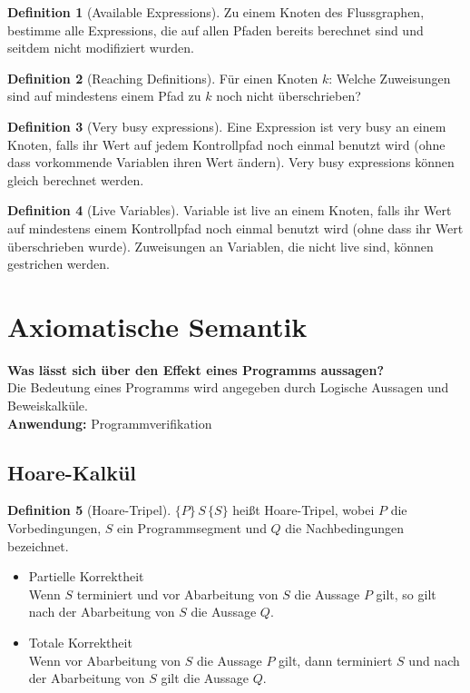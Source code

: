 \documentclass{scrreprt}
\theoremstyle{definition}
\newtheorem{Definition}{Definition}[section]
\theoremstyle{example}
\theoremstyle{algorithm}
\begin{document}
\begin{Definition}[Available Expressions]
Zu einem Knoten des Flussgraphen, bestimme alle Expressions, die auf allen Pfaden bereits berechnet sind und seitdem nicht modifiziert wurden.
\end{Definition}

\begin{Definition}[Reaching Definitions]
Für einen Knoten $k$: Welche Zuweisungen sind auf mindestens einem Pfad zu $k$ noch nicht überschrieben?
\end{Definition}

\begin{Definition}[Very busy expressions]
Eine Expression ist very busy an einem Knoten, falls ihr Wert auf jedem Kontrollpfad noch einmal benutzt wird (ohne dass vorkommende Variablen ihren Wert ändern). Very busy expressions können gleich berechnet werden.
\end{Definition}

\begin{Definition}[Live Variables]
Variable ist live an einem Knoten, falls ihr Wert auf mindestens einem Kontrollpfad noch einmal benutzt wird (ohne dass ihr Wert überschrieben wurde). Zuweisungen an Variablen, die nicht live sind, können gestrichen werden.
\end{Definition}

\section{Axiomatische Semantik}
\textbf{\textsf{Was lässt sich über den Effekt eines Programms aussagen?}}\\
Die Bedeutung eines Programms wird angegeben durch Logische Aussagen und Beweiskalküle.\\
\textbf{Anwendung:} Programmverifikation

\subsection{Hoare-Kalkül}

\begin{Definition}[Hoare-Tripel]
$\{P\}\,S\,\{S\}$ heißt Hoare-Tripel, wobei $P$ die Vorbedingungen, $S$ ein Programmsegment und $Q$ die Nachbedingungen bezeichnet.
\begin{itemize}
\item Partielle Korrektheit\\
Wenn $S$ terminiert und vor Abarbeitung von $S$ die Aussage $P$ gilt, so gilt nach der Abarbeitung von $S$ die Aussage $Q$.
\item Totale Korrektheit\\
Wenn vor Abarbeitung von $S$ die Aussage $P$ gilt, dann terminiert $S$ und nach der Abarbeitung von $S$ gilt die Aussage $Q$.
\end{itemize}
\end{Definition}
\end{document}
